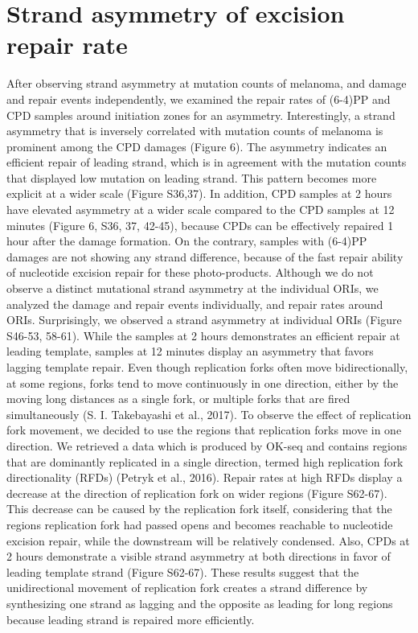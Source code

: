 \section{Strand asymmetry of excision repair rate}

After observing strand asymmetry at mutation counts of melanoma, and damage and repair events independently, we examined the repair rates of (6-4)PP and CPD samples around initiation zones for an asymmetry. Interestingly, a strand asymmetry that is inversely correlated with mutation counts of melanoma is prominent among the CPD damages (Figure 6). The asymmetry indicates an efficient repair of leading strand, which is in agreement with the mutation counts that displayed low mutation on leading strand. This pattern becomes more explicit at a wider scale (Figure S36,37). In addition, CPD samples at 2 hours have elevated asymmetry at a wider scale compared to the CPD samples at 12 minutes (Figure 6, S36, 37, 42-45), because CPDs can be effectively repaired 1 hour after the damage formation. On the contrary, samples with (6-4)PP damages are not showing any strand difference, because of the fast repair ability of nucleotide excision repair for these photo-products. Although we do not observe a distinct mutational strand asymmetry at the individual ORIs, we analyzed the damage and repair events individually, and repair rates around ORIs. Surprisingly, we observed a strand asymmetry at individual ORIs (Figure S46-53, 58-61). While the samples at 2 hours demonstrates an efficient repair at leading template, samples at 12 minutes display an asymmetry that favors lagging template repair. 
Even though replication forks often move bidirectionally, at some regions, forks tend to move continuously in one direction, either by the moving long distances as a single fork, or multiple forks that are fired simultaneously (S. I. Takebayashi et al., 2017). To observe the effect of replication fork movement, we decided to use the regions that replication forks move in one direction. We retrieved a data which is produced by OK-seq and contains regions that are dominantly replicated in a single direction, termed high replication fork directionality (RFDs) (Petryk et al., 2016). Repair rates at high RFDs display a decrease at the direction of replication fork on wider regions (Figure S62-67). This decrease can be caused by the replication fork itself, considering that the regions replication fork had passed opens and becomes reachable to nucleotide excision repair, while the downstream will be relatively condensed. Also, CPDs at 2 hours demonstrate a visible strand asymmetry at both directions in favor of leading template strand (Figure S62-67). These results suggest that the unidirectional movement of replication fork creates a strand difference by synthesizing one strand as lagging and the opposite as leading for long regions because leading strand is repaired more efficiently.

